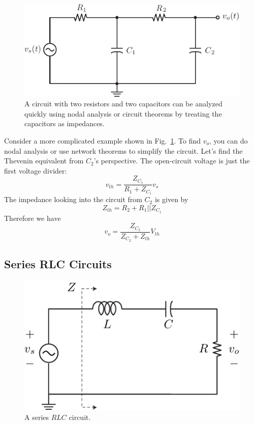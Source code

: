 \begin{figure}[tb]
\begin{center}
\includegraphics[angle=-0.0,scale=1]{mod1_3_7_rc_lpf2}
\end{center}
\caption{A circuit with two resistors and two capacitors can be analyzed quickly using nodal analysis or circuit theorems by treating the capacitors as impedances.} \label{fig:bigexample}
\end{figure}


  
Consider a more complicated example shown in Fig.~\ref{fig:bigexample}.  To find $v_o$, you can do nodal analysis or use network theorems to simplify the circuit.  Let's find the Thevenin equivalent from $C_2$'s perspective.  The open-circuit voltage is just the first voltage divider:
\begin{equation}
	v_{th} = \frac{Z_{C_1}}{R_1 + Z_{C_1}} v_s 
\end{equation}
The impedance looking into the circuit from $C_2$ is given by
\begin{equation}
	Z_{th} = R_2 + R_1 || Z_{C_1}
\end{equation}
Therefore we have  
\begin{equation}
	v_o = \frac{Z_{C_2}}{Z_{C_2} + Z_{th}} V_{th} 
\end{equation}



\subsection{Series RLC Circuits} \label{sec:lcr}

\begin{figure}
\begin{center}
\includegraphics[scale=1]{rlc}
\end{center}
\caption{A series $RLC$ circuit. } \label{fig:rlc}
\end{figure}

